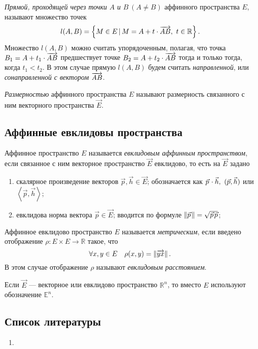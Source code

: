 \begin{definition}
  \textit{Прямой, проходящей через точки $A$ и $B~(A \neq B)$} аффинного
  пространства $E$, называют множество точек
  \begin{equation*}
    l(A,B) = \left\{ M \in E \, | \, M = A + t \cdot \overrightarrow{AB},~t \in \mathbb{R}
    \right\}.
  \end{equation*}
  Множество $l(A,B)$ можно считать упорядоченным, полагая, что точка $B_1 = A +
  t_1 \cdot \overrightarrow{AB}$ предшествует точке $B_2 = A + t_2 \cdot \overrightarrow{AB}$ тогда и
  только тогда, когда $t_1 < t_2$. В этом случае прямую $l(A,B)$ будем считать
  \textit{направленной}, или \textit{сонаправленной с вектором $\overrightarrow{AB}$}.
\end{definition}

\begin{definition}
  \textit{Размерностью} аффинного пространства $E$ называют размерность
  связанного с ним векторного пространства $\vec{E}$.
\end{definition}

\subsection{Аффинные евклидовы пространства}

\begin{definition}
  Аффинное пространство $E$ называется \textit{евклидовым аффинным
  пространством}, если связанное с ним векторное пространство $\vec{E}$
  евклидово, то есть на $\vec{E}$ задано
  \begin{enumerate}
    \item скалярное произведение векторов $\vec{p}, \vec{h} \in \vec{E}$;
      обозначается как $\dotprod{\wvec{p}}{\vec{h}},~(\vec{p},\vec{h})$ или
      $\left\langle \vec{p},\vec{h} \right\rangle$;
    \item евклидова норма вектора $\vec{p} \in \vec{E}$; вводится по формуле
      $\norm{\wvec{p}} = \sqrt{\wvec{p}\vec{p}}$;
  \end{enumerate}
\end{definition}

\begin{definition}
  Аффинное евклидово пространство $E$ называется \textit{метрическим}, если
  введено отображение $\rho : E \times E \to \mathbb{R}$ такое, что
  \begin{equation*}
    \forall x,y \in E \quad \rho(x,y) = \left\lVert\overrightarrow{yx}\right\rVert.
  \end{equation*}
  В этом случае отображение $\rho$ называют \textit{евклидовым расстоянием}.
\end{definition}

Если $\vec{E}$ --- векторное или евклидово пространство $\mathbb{R}^n$, то
вместо $E$ используют обозначение $\mathbb{E}^n$.

\subsection{Список литературы}
\begin{enumerate}
  \item \cite{lectures}
\end{enumerate}

